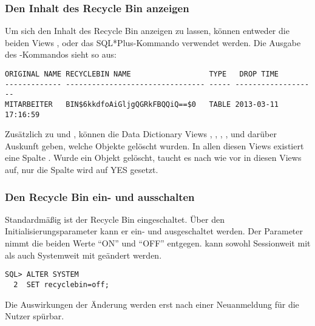         \subsubsection{Den Inhalt des Recycle Bin anzeigen}
          Um sich den Inhalt des Recycle Bin anzeigen zu lassen, k\"onnen entweder die beiden Views ,  oder das SQL*Plus-Kommando  verwendet werden. Die Ausgabe des -Kommandos sieht so aus:
          \begin{lstlisting}[caption={\languagesqlplus{show recyclebin}},label=admin1721,language=oracle_sql,emph={[9]RECYCLEBIN,TYPE,TIME,DROP,TABLE},emphstyle={[9]\color{black}}]
ORIGINAL NAME RECYCLEBIN NAME                  TYPE   DROP TIME
------------- -------------------------------- ----- -------------------
MITARBEITER   BIN$6kkdfoAiGljgQGRkFBQQiQ==$0   TABLE 2013-03-11 17:16:59
          \end{lstlisting}
          Zus\"atzlich zu  und , k\"onnen die Data Dictionary Views , , , ,  und  dar\"uber Auskunft geben, welche Objekte gel\"oscht wurden. In allen diesen Views existiert eine Spalte . Wurde ein Objekt gel\"oscht, taucht es nach wie vor in diesen Views auf, nur die Spalte  wird auf YES gesetzt.
\clearpage
        \subsubsection{Den Recycle Bin ein- und ausschalten}
          Standardm\"a\ss ig ist der Recycle Bin eingeschaltet. \"Uber den Initialisierungsparameter  kann er ein- und ausgeschaltet werden. Der Parameter nimmt die beiden Werte \enquote{ON} und \enquote{OFF} entgegen.  kann sowohl Sessionweit mit  als auch Systemweit mit  ge\"andert werden.
          \begin{lstlisting}[caption={\languageorasql{Den Recycle Bin ausschalten}},label=admin1722,language=oracle_sql]
SQL> ALTER SYSTEM
  2  SET recyclebin=off;
          \end{lstlisting}
          Die Auswirkungen der \"Anderung werden erst nach einer Neuanmeldung f\"ur die Nutzer sp\"urbar.

